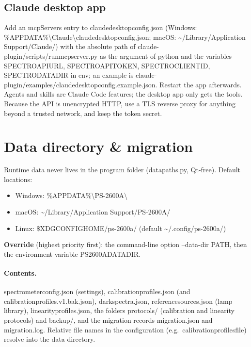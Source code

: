 \documentclass[12pt,a4paper]{article}
\DeclareRobustCommand{\code}[1]{{\ttfamily\small\def\_{\rawus\allowbreak}#1}}
\DeclareRobustCommand{\file}[1]{{\ttfamily\small\def\_{\rawus\allowbreak}#1}}
\DeclareRobustCommand{\key}[1]{{\ttfamily\small\color{acc2}\def\_{\rawus\allowbreak}#1}}
\begin{document}
\subsection{Claude desktop app}
Add an \code{mcpServers} entry to \file{claude\_desktop\_config.json}
(Windows: \file{\%APPDATA\%\textbackslash Claude\textbackslash claude\_desktop\_config.json};
macOS: \file{\textasciitilde/Library/Application Support/Claude/}) with the absolute
path of \file{claude-plugin/scripts/run\_mcp\_server.py} as the argument of
\code{python} and the variables \code{SPECTRO\_API\_URL}, \code{SPECTRO\_API\_TOKEN},
\code{SPECTRO\_CLIENT\_ID}, \code{SPECTRO\_DATA\_DIR} in \code{env}; an example is
\file{claude-plugin/examples/claude\_desktop\_config.example.json}. Restart the app
afterwards. Agents and skills are Claude Code features; the desktop app only gets
the tools. Because the API is unencrypted HTTP, use a TLS reverse proxy for anything
beyond a trusted network, and keep the token secret.

\section{Data directory \& migration}\label{sec:datadir}
Runtime data never lives in the program folder (\file{data\_paths.py}, Qt-free).
Default locations:
\begin{itemize}
  \item Windows: \file{\%APPDATA\%\textbackslash PS-2600A\textbackslash}
  \item macOS: \file{\textasciitilde/Library/Application Support/PS-2600A/}
  \item Linux: \file{\$XDG\_CONFIG\_HOME/ps-2600a/} (default
        \file{\textasciitilde/.config/ps-2600a/})
\end{itemize}
\textbf{Override} (highest priority first): the command-line option
\code{--data-dir PATH}, then the environment variable \code{PS2600A\_DATA\_DIR}.

\paragraph{Contents.} \file{spectrometer\_config.json} (settings),
\file{calibration\_profiles.json} (and \file{calibration\_profiles.v1.bak.json}),
\file{dark\_spectra.json}, \file{reference\_sources.json} (lamp library),
\file{linearity\_profiles.json}, the folders \file{protocols/} (calibration and
linearity protocols) and \file{backup/}, and the migration records
\file{migration.json} and \file{migration.log}. Relative file names in the
configuration (e.g.\ \key{calibration\_profiles\_file}) resolve into the data
directory.
\end{document}
